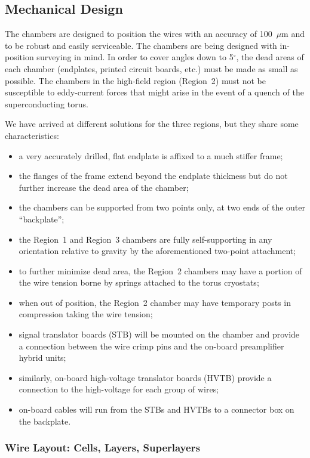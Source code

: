 \subsection{Mechanical Design}

The chambers are designed to position the wires with an accuracy of 
100~$\mu$m and to be robust and easily serviceable.  The chambers are 
being designed with in-position surveying in mind.  In order to cover 
angles down to 5$^\circ$, the dead areas of each chamber (endplates, 
printed circuit boards, etc.) must be made as small as possible.  The 
chambers in the high-field region (Region~2) must not be susceptible to 
eddy-current forces that might arise in the event of a quench of the 
superconducting torus.

We have arrived at different solutions for the three regions, but they
share some characteristics:

\begin{itemize}
\item a very accurately drilled, flat endplate is affixed to a much stiffer
frame;
\item the flanges of the frame extend beyond the endplate thickness but
do not further increase the dead area of the chamber;
\item the chambers can be supported from two points only, at two ends of
the outer ``backplate'';
\item the Region~1 and Region~3 chambers are fully self-supporting in any 
orientation relative to gravity by the aforementioned two-point attachment;
\item to further minimize dead area, the Region~2 chambers may have a portion
of the wire tension borne by springs attached to the torus cryostats;
\item when out of position, the Region~2 chamber may have temporary posts
in compression taking the wire tension;
\item signal translator boards (STB) will be mounted on the chamber and
provide a connection between the wire crimp pins and the on-board 
preamplifier hybrid units;
\item similarly, on-board high-voltage translator boards (HVTB) provide a
connection to the high-voltage for each group of wires;
\item on-board cables will run from the STBs and HVTBs to a connector box 
on the backplate.
\end{itemize}

\subsubsection{Wire Layout: Cells, Layers, Superlayers}

